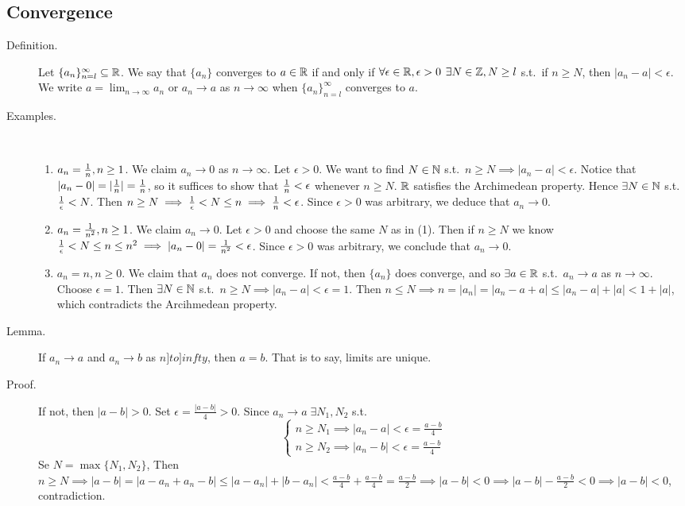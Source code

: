\documentclass[letterpaper,11pt]{article}
\begin{document}
\subsection{Convergence}
\begin{description}
\item[Definition.] Let $\{a_n\}^\infty_{n=l}\subseteq\mathbb{R}$. We say that
    $\{a_n\}$ converges to $a\in\mathbb{R}$ if and only if $\forall\epsilon\in\mathbb{R},
    \epsilon>0$ $\exists N\in\mathbb{Z},N\ge l$ s.t.\ if $n\ge N$,
    then $|a_n-a|<\epsilon$.\\
    We write $a=\lim_{n\to\infty} a_n$ or $a_n\to a$ as $n\to\infty$
    when $\{a_n\}^\infty_{n=l}$ converges to $a$.


\item[Examples.]\text{}\vspace{-0.2in}\\
  \begin{enumerate}[(1)]
  \item $a_n=\frac{1}{n}, n\ge 1$. We claim $a_n\to 0$ as $n\to\infty$.
      Let $\epsilon>0$. We want to find $N\in\mathbb{N}$ s.t.\
      $n\ge N\implies |a_n-a|<\epsilon$. Notice that
      $|a_n-0|=|\frac{1}{n}|=\frac{1}{n}$, so it suffices to show that
      $\frac{1}{n}<\epsilon$ whenever $n\ge N$. $\mathbb{R}$ satisfies the
      Archimedean property. Hence $\exists N\in\mathbb{N}$ s.t.\ $\frac{1}{\epsilon}<N$.
      Then $n\ge N\implies\frac{1}{\epsilon}<N\le n\implies\frac{1}{n}<\epsilon$.
      Since $\epsilon>0$ was arbitrary, we deduce that $a_n\to0$.

  \item $a_n=\frac{1}{n^2},n\ge1$. We claim $a_n\to0$. Let $\epsilon>0$
      and choose the same $N$ as in (1). Then if $n\ge N$ we know
      $\frac{1}{\epsilon}< N\le n\le n^2\implies|a_n-0|=\frac{1}{n^2}<\epsilon$.
      Since $\epsilon>0$ was arbitrary, we conclude that $a_n\to0$.
  
  \item $a_n=n,n\ge0$. We claim that $a_n$ does not converge.
      If not, then $\{a_n\}$ does converge, and so $\exists a\in\mathbb{R}$ s.t.\
      $a_n\to a$ as $n\to\infty$. Choose $\epsilon=1$. Then $\exists N\in\mathbb{N}$
      s.t.\ $n\ge N\implies|a_n-a|<\epsilon=1$. Then $n\le N\implies
      n=|a_n|=|a_n-a+a|\le|a_n-a|+|a|<1+|a|$, which contradicts
      the Arcihmedean property.
  \end{enumerate}


\item[Lemma.] If $a_n\to a$ and $a_n\to b$ as $n]to]infty$, then $a=b$.
    That is to say, limits are unique.
\item[Proof.] If not, then $|a-b|>0$. Set $\epsilon=\frac{|a-b|}{4}>0$.
    Since $a_n\to a\;\exists N_1,N_2$ s.t.\ 
    \[\begin{cases}
    n\ge N_1\implies |a_n-a|<\epsilon=\frac{a-b}{4}\\
    n\ge N_2\implies |a_n-b|<\epsilon=\frac{a-b}{4}
    \end{cases}\]
    Se $N=\max\{N_1,N_2\}$, Then $n\ge N\implies |a-b|=|a-a_n+a_n-b|
    \le |a-a_n|+|b-a_n|<\frac{a-b}{4}+\frac{a-b}{4}=\frac{a-b}{2}\implies
    |a-b|<0\implies|a-b|-\frac{a-b}{2}<0\implies|a-b|<0$, contradiction.


\end{description}
\end{document}

